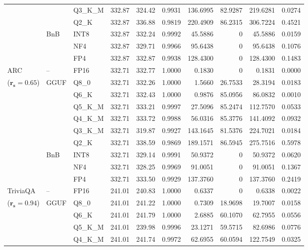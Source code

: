 \begin{longtable}{ll l rrrrrrr}
 &  & Q3\_K\_M & 332.87 & 324.42 & 0.9931 & 136.6995 & 82.9287 & 219.6281 & 0.0274 \\
 &  & Q2\_K & 332.87 & 336.88 & 0.9819 & 220.4909 & 86.2315 & 306.7224 & 0.4521 \\
 & BnB & INT8 & 332.87 & 332.24 & 0.9992 & 45.5886 & \cellcolor{cyan!12} $0$ & 45.5886 & 0.0159 \\
 &  & NF4 & 332.87 & 329.71 & 0.9966 & 95.6438 & \cellcolor{cyan!12} $0$ & 95.6438 & 0.1076 \\
 &  & FP4 & 332.87 & 332.87 & 0.9938 & 128.4300 & \cellcolor{cyan!12} $0$ & 128.4300 & 0.1483 \\
\midrule
ARC & -- & FP16 & 332.71 & 332.77 & 1.0000 & 0.1830 & \cellcolor{cyan!12} $0$ & 0.1831 & 0.0000 \\
{\small ($\mathbf{r_s{=}0.65}$)} & GGUF & Q8\_0 & 332.71 & 332.26 & 1.0000 & 1.5660 & 26.7533 & 28.3194 & 0.0183 \\
 &  & Q6\_K & 332.71 & 332.43 & 1.0000 & 0.9876 & 85.0956 & 86.0832 & 0.0010 \\
 &  & Q5\_K\_M & 332.71 & 333.21 & 0.9997 & 27.5096 & 85.2474 & 112.7570 & 0.0533 \\
 &  & Q4\_K\_M & 332.71 & 333.72 & 0.9988 & 56.0316 & 85.3776 & 141.4092 & 0.0932 \\
 &  & Q3\_K\_M & 332.71 & 319.87 & 0.9927 & 143.1645 & 81.5376 & 224.7021 & 0.0184 \\
 &  & Q2\_K & 332.71 & 338.59 & 0.9869 & 189.1571 & 86.5945 & 275.7516 & 0.5978 \\
 & BnB & INT8 & 332.71 & 329.14 & 0.9991 & 50.9372 & \cellcolor{cyan!12} $0$ & 50.9372 & 0.0620 \\
 &  & NF4 & 332.71 & 328.25 & 0.9969 & 91.0051 & \cellcolor{cyan!12} $0$ & 91.0051 & 0.1367 \\
 &  & FP4 & 332.71 & 333.50 & 0.9929 & 137.3760 & \cellcolor{cyan!12} $0$ & 137.3760 & 0.2419 \\
\midrule
TriviaQA & -- & FP16 & 241.01 & 240.83 & 1.0000 & 0.6337 & \cellcolor{cyan!12} $0$ & 0.6338 & 0.0022 \\
{\small ($\mathbf{r_s{=}0.94}$)} & GGUF & Q8\_0 & 241.01 & 241.22 & 1.0000 & 0.7309 & 18.9698 & 19.7007 & 0.0158 \\
 &  & Q6\_K & 241.01 & 241.79 & 1.0000 & 2.6885 & 60.1070 & 62.7955 & 0.0556 \\
 &  & Q5\_K\_M & 241.01 & 239.98 & 0.9996 & 23.1271 & 59.5715 & 82.6986 & 0.0776 \\
 &  & Q4\_K\_M & 241.01 & 241.74 & 0.9972 & 62.6955 & 60.0594 & 122.7549 & 0.0325 \\

\end{longtable}

